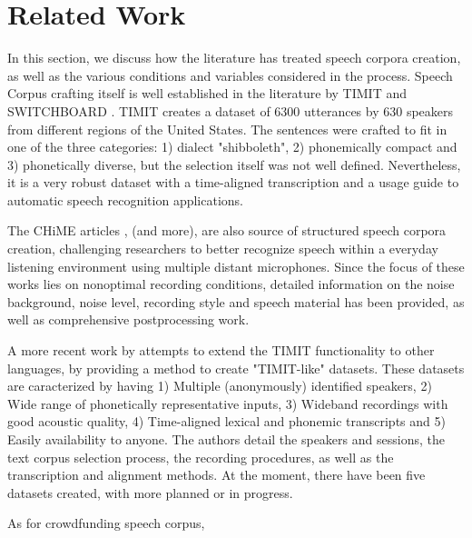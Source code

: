 \chapter[Related Work]{Related Work}

In this section, we discuss how the literature has treated speech corpora creation, as well as the various conditions and variables considered in the process. Speech Corpus crafting itself is well established in the literature by TIMIT \cite{Lamel1992timmit} and SWITCHBOARD \cite{godfrey1992switchboard}. TIMIT creates a dataset of 6300 utterances by 630 speakers from different regions of the United States. The sentences were crafted to fit in one of the three categories: 1) dialect "shibboleth", 2) phonemically compact and 3) phonetically diverse, but the selection itself was not well defined. Nevertheless, it is a very robust dataset with a time-aligned transcription and a usage guide to automatic speech recognition applications.

The CHiME articles \cite{christensen2010chime} \cite{barker2013pascal}, \cite{barker2018fifth} (and more), are also source of structured speech corpora creation, challenging researchers to better recognize speech within a everyday listening environment using multiple distant microphones. Since the focus of these works lies on nonoptimal recording conditions, detailed information on the noise background, noise level, recording style and speech material has been provided, as well as comprehensive postprocessing work.

A more recent work by \cite{chanchaochai2018globaltimit} attempts to extend the TIMIT functionality to other languages, by providing a method to create "TIMIT-like" datasets. These datasets are caracterized by having 1) Multiple (anonymously) identified speakers, 2) Wide range of phonetically representative inputs, 3) Wideband recordings with good acoustic quality, 4) Time-aligned lexical and phonemic transcripts and 5) Easily availability to anyone. The authors detail the speakers and sessions, the text corpus selection process, the recording procedures, as well as the transcription and alignment methods. At the moment, there have been five datasets created, with more planned or in progress.

As for crowdfunding speech corpus, 